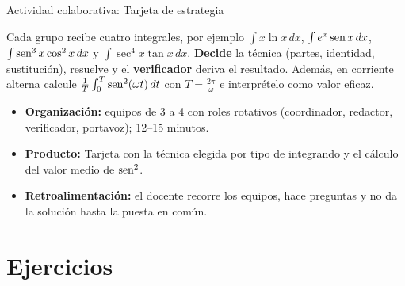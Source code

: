 \documentclass[10pt,aspectratio=169]{beamer}
\begin{document}
\begin{frame}{Actividad colaborativa: Tarjeta de estrategia}
  \small
  \begin{activa}
    Cada grupo recibe cuatro integrales, por ejemplo $\int x\ln x\,dx$, $\int e^x\operatorname{sen} x\,dx$, $\int\operatorname{sen}^3x\cos^2x\,dx$ y $\int\sec^4x\tan x\,dx$. \textbf{Decide} la técnica (partes, identidad, sustitución), resuelve y el \textbf{verificador} deriva el resultado. Además, en corriente alterna calcule $\frac1T\int_0^T\operatorname{sen}^2(\omega t)\,dt$ con $T=\frac{2\pi}{\omega}$ e interprételo como valor eficaz.
  \end{activa}
  \begin{itemize}
    \item \textbf{Organización:} equipos de 3 a 4 con roles rotativos (coordinador, redactor, verificador, portavoz); 12--15 minutos.
    \item \textbf{Producto:} Tarjeta con la técnica elegida por tipo de integrando y el cálculo del valor medio de $\operatorname{sen}^2$.
    \item \textbf{Retroalimentación:} el docente recorre los equipos, hace preguntas y no da la solución hasta la puesta en común.
  \end{itemize}
\end{frame}

\section{Ejercicios}
\end{document}
